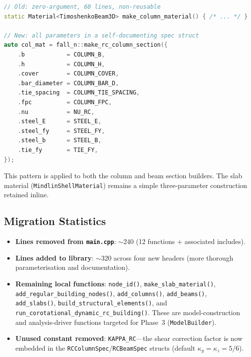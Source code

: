 \begin{lstlisting}[language=C++,basicstyle=\small\ttfamily]
// Old: zero-argument, 60 lines, non-reusable
static Material<TimoshenkoBeam3D> make_column_material() { /* ... */ }

// New: all parameters in a self-documenting spec struct
auto col_mat = fall_n::make_rc_column_section({
    .b            = COLUMN_B,
    .h            = COLUMN_H,
    .cover        = COLUMN_COVER,
    .bar_diameter = COLUMN_BAR_D,
    .tie_spacing  = COLUMN_TIE_SPACING,
    .fpc          = COLUMN_FPC,
    .nu           = NU_RC,
    .steel_E      = STEEL_E,
    .steel_fy     = STEEL_FY,
    .steel_b      = STEEL_B,
    .tie_fy       = TIE_FY,
});
\end{lstlisting}

This pattern is applied to both the column and beam section builders.
The slab material (\texttt{MindlinShellMaterial}) remains a simple
three-parameter construction retained inline.

\subsection{Migration Statistics}
\label{sec:phase2-statistics}

\begin{itemize}
  \item \textbf{Lines removed from \texttt{main.cpp}}: $\sim$240
        (12 functions + associated includes).
  \item \textbf{Lines added to library}: $\sim$320 across four new
        headers (more thorough parameterisation and documentation).
  \item \textbf{Remaining local functions}: \texttt{node\_id()},
        \texttt{make\_slab\_material()},
        \texttt{add\_regular\_building\_nodes()},
        \texttt{add\_columns()}, \texttt{add\_beams()},
        \texttt{add\_slabs()}, \texttt{build\_structural\_elements()},
        and \texttt{run\_corotational\_dynamic\_rc\_building()}.
        These are model-construction and analysis-driver functions
        targeted for Phase~3 (\texttt{ModelBuilder}).
  \item \textbf{Unused constant removed}: \texttt{KAPPA\_RC}---the
        shear correction factor is now embedded in the
        \texttt{RCColumnSpec}/\texttt{RCBeamSpec} structs
        (default $\kappa_y = \kappa_z = 5/6$).
\end{itemize}

